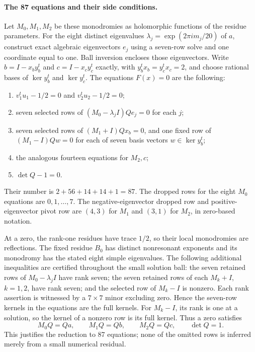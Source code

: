 \paragraph{The 87 equations and their side conditions.}
Let $M_0,M_1,M_2$ be these monodromies as holomorphic functions of
the residue parameters. For the eight distinct eigenvalues
$\lambda_j=\exp(2\pi i m_j/20)$ of $a$, construct exact algebraic
eigenvectors $e_j$ using a seven-row solve and one coordinate equal
to one. Ball inversion encloses those eigenvectors. Write
$b=I-x_by_b^t$ and $c=I-x_cy_c^t$ exactly, with
$y_b^tx_b=y_c^tx_c=2$, and choose rational bases of
$\ker y_b^t$ and $\ker y_c^t$.
The equations $F(x)=0$ are the following:
\begin{enumerate}
\item $v_1^tu_1-1/2=0$ and $v_2^tu_2-1/2=0$;
\item seven selected rows of $(M_0-\lambda_jI)Qe_j=0$ for each $j$;
\item seven selected rows of $(M_1+I)Qx_b=0$, and one fixed row
of $(M_1-I)Qw=0$ for each of seven basis vectors $w\in\ker y_b^t$;
\item the analogous fourteen equations for $M_2,c$;
\item $\det Q-1=0$.
\end{enumerate}
Their number is $2+56+14+14+1=87$. The dropped rows for the eight
$M_0$ equations are $0,1,\ldots,7$. The negative-eigenvector dropped
row and positive-eigenvector pivot row are $(4,3)$ for $M_1$ and
$(3,1)$ for $M_2$, in zero-based notation.

At a zero, the rank-one residues have trace $1/2$, so their local
monodromies are reflections. The fixed residue $B_0$ has distinct
nonresonant exponents and its monodromy has the stated eight simple
eigenvalues. The following additional inequalities are certified
throughout the small solution ball: the seven retained rows of
$M_0-\lambda_jI$ have rank seven; the seven retained rows of each
$M_k+I$, $k=1,2$, have rank seven; and the selected row of $M_k-I$
is nonzero. Each rank assertion is witnessed by a $7\times7$
minor excluding zero. Hence the seven-row kernels in the equations
are the full kernels. For $M_k-I$, its rank is one at a solution,
so the kernel of a nonzero row is its full kernel. Thus a zero
satisfies
\[
M_0Q=Qa,\qquad M_1Q=Qb,\qquad M_2Q=Qc,\qquad \det Q=1.
\tag{R3}
\]
This justifies the reduction to 87 equations; none of the omitted
rows is inferred merely from a small numerical residual.

